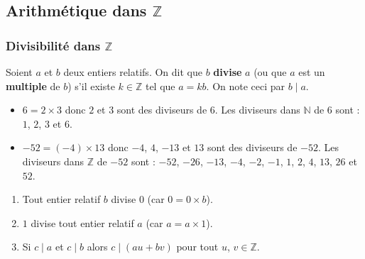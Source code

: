 




  
  \subsection{Arithmétique dans \texorpdfstring{$\mathbb{Z}$}{Z}}
  
  \subsubsection{Divisibilité dans \texorpdfstring{$\mathbb{Z}$}{Z}}
  
  \begin{definition}
    Soient $a$ et $b$ deux entiers relatifs. On dit que $b$ \textbf{divise} $a$ (ou que $a$ est un \textbf{multiple} de $b$) s'il existe $k \in \mathbb{Z}$ tel que $a = kb$. On note ceci par $b \mid a$.
  \end{definition}
  
  \begin{example}
    \begin{itemize}
      \item $6 = 2 \times 3$ donc $2$ et $3$ sont des diviseurs de $6$.
      Les diviseurs dans $\mathbb{N}$ de $6$ sont : $1$, $2$, $3$ et $6$.
      \item $-52 = (-4) \times 13$ donc $-4$, $4$, $-13$ et $13$ sont des diviseurs de $-52$. Les diviseurs dans $\mathbb{Z}$ de $-52$ sont : $-52$, $-26$, $-13$, $-4$, $-2$, $-1$, $1$, $2$, $4$, $13$, $26$ et $52$.
    \end{itemize}
  \end{example}
  
  \begin{proposition}
    \begin{enumerate}[label=(\roman*)]
      \item Tout entier relatif $b$ divise $0$ (car $0 = 0 \times b$).
      \item $1$ divise tout entier relatif $a$ (car $a = a \times 1$).
      \item Si $c \mid a$ et $c \mid b$ alors $c \mid (au + bv)$ pour tout $u$, $v \in \mathbb{Z}$.
    \end{enumerate}
  \end{proposition}
  
